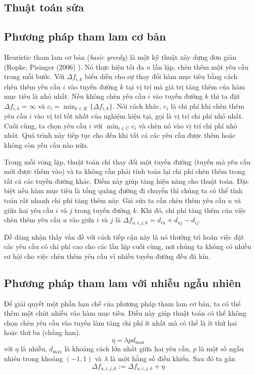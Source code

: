 \subsection{Thuật toán sửa}


\subsection{Phương pháp tham lam cơ bản}
\label{sec:basic_greedy}
Heuristic tham lam cơ bản (\textit{basic greedy}) là một kỹ thuật xây dựng đơn giản (Ropke, Pisinger (2006) \cite{ropke2006adaptive}). Nó thực hiện tối đa $n$ lần lặp, chèn thêm một yêu cầu trong mỗi bước. Với $\Delta f_{i, k}$ biểu diễn cho sự thay đổi hàm mục tiêu bằng cách chèn thêm yêu cầu $i$ vào tuyến đường $k$ tại vị trí mà giá trị tăng thêm của hàm mục tiêu là nhỏ nhất. Nếu không chèn yêu cầu $i$ vào tuyến đường $k$ thì ta đặt $\Delta f_{i, k} = \infty$ và $c_i = \min_{k \in K}\{\Delta f_{i, k}\}$. Nói cách khác, $c_i$ là chi phí khi chèn thêm yêu cầu $i$ vào vị trí tốt nhất của nghiệm hiện tại, gọi là vị trí chi phí nhỏ nhất. Cuối cùng, ta chọn yêu cầu $i$ với $\min_{i \in U} c_i$ và chèn nó vào vị trí chi phí nhỏ nhất. Quá trình này tiếp tục cho đến khi tất cả các yêu cầu được thêm hoặc không còn yêu cầu nào nữa.

Trong mỗi vòng lặp, thuật toán chỉ thay đổi một tuyến đường (tuyến mà yêu cầu mới được thêm vào) và ta không cần phải tính toán lại chi phí chèn thêm trong tất cả các tuyến đường khác. Điểm này giúp tăng hiệu năng cho thuật toán. Đặc biệt nếu hàm mục tiêu là tổng quãng đường đi chuyển thì chúng ta có thể tính toán rất nhanh chi phí tăng thêm này. Giả sửa ta cần chèn thêm yêu cầu $u$ và giữa hai yêu cầu $i$ và $j$ trong tuyến đường $k$. Khi đó, chi phí tăng thêm của việc chèn thêm yêu cầu $u$ vào giữa $i$ và $j$ là $\Delta f_{u, i, j, k} = d_{iu} + d_{uj} - d_{ij}$.

Dễ dàng nhận thấy vấn đề với cách tiếp cận này là nó thường trì hoãn việc đặt các yêu cầu có chi phí cao cho các lần lặp cuối cùng, nơi chúng ta không có nhiều cơ hội cho việc chèn thêm yêu cầu vì nhiều tuyến đường đều đã kín. 

\subsection{Phương pháp tham lam với nhiễu ngẫu nhiên}

Để giải quyết một phần hạn chế của phương pháp tham lam cơ bản, ta có thể thêm một chút nhiễu vào hàm mục tiêu. Điều này giúp thuật toán có thể không chọn chèn yêu cầu vào tuyến làm tăng chi phí ít nhất mà có thể là ít thứ hai hoặc thứ ba (chẳng hạn). 
\begin{equation}
  \eta = \lambda p d_{\text{max}}
\end{equation}
với $\eta$ là nhiễu, $d_{\text{max}}$ là khoảng cách lớn nhất giữa hai yêu cầu, $p$ là một số ngẫu nhiên trong khoảng $(-1,1)$ và $\lambda$ là một hằng số điều khiển. Sau đó ta gán
\begin{equation}
  \Delta f_{u, i, j, k} := \Delta f_{u, i, j, k} + \eta
\end{equation}

